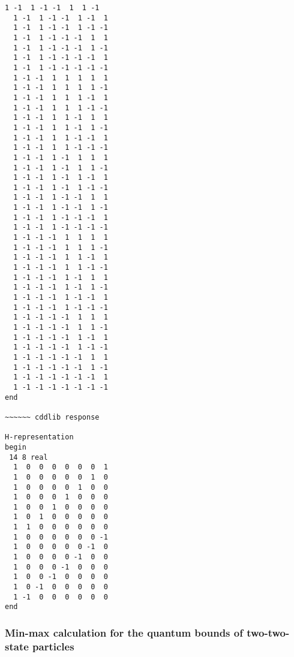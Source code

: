 \documentclass[%
 showpacs,
 showkeys,
 preprintnumbers,
 amsmath,amssymb,
 aps,
  pra,
  longbibliography,
 floatfix,
 ]{revtex4-1}
\begin{document}
{\begin{lstlisting}[backgroundcolor=\color{yellow!10},framerule=0pt,breaklines=true, frame=tb]
  1 -1  1 -1 -1  1  1 -1
  1 -1  1 -1 -1  1 -1  1
  1 -1  1 -1 -1  1 -1 -1
  1 -1  1 -1 -1 -1  1  1
  1 -1  1 -1 -1 -1  1 -1
  1 -1  1 -1 -1 -1 -1  1
  1 -1  1 -1 -1 -1 -1 -1
  1 -1 -1  1  1  1  1  1
  1 -1 -1  1  1  1  1 -1
  1 -1 -1  1  1  1 -1  1
  1 -1 -1  1  1  1 -1 -1
  1 -1 -1  1  1 -1  1  1
  1 -1 -1  1  1 -1  1 -1
  1 -1 -1  1  1 -1 -1  1
  1 -1 -1  1  1 -1 -1 -1
  1 -1 -1  1 -1  1  1  1
  1 -1 -1  1 -1  1  1 -1
  1 -1 -1  1 -1  1 -1  1
  1 -1 -1  1 -1  1 -1 -1
  1 -1 -1  1 -1 -1  1  1
  1 -1 -1  1 -1 -1  1 -1
  1 -1 -1  1 -1 -1 -1  1
  1 -1 -1  1 -1 -1 -1 -1
  1 -1 -1 -1  1  1  1  1
  1 -1 -1 -1  1  1  1 -1
  1 -1 -1 -1  1  1 -1  1
  1 -1 -1 -1  1  1 -1 -1
  1 -1 -1 -1  1 -1  1  1
  1 -1 -1 -1  1 -1  1 -1
  1 -1 -1 -1  1 -1 -1  1
  1 -1 -1 -1  1 -1 -1 -1
  1 -1 -1 -1 -1  1  1  1
  1 -1 -1 -1 -1  1  1 -1
  1 -1 -1 -1 -1  1 -1  1
  1 -1 -1 -1 -1  1 -1 -1
  1 -1 -1 -1 -1 -1  1  1
  1 -1 -1 -1 -1 -1  1 -1
  1 -1 -1 -1 -1 -1 -1  1
  1 -1 -1 -1 -1 -1 -1 -1
end

~~~~~~ cddlib response

H-representation
begin
 14 8 real
  1  0  0  0  0  0  0  1
  1  0  0  0  0  0  1  0
  1  0  0  0  0  1  0  0
  1  0  0  0  1  0  0  0
  1  0  0  1  0  0  0  0
  1  0  1  0  0  0  0  0
  1  1  0  0  0  0  0  0
  1  0  0  0  0  0  0 -1
  1  0  0  0  0  0 -1  0
  1  0  0  0  0 -1  0  0
  1  0  0  0 -1  0  0  0
  1  0  0 -1  0  0  0  0
  1  0 -1  0  0  0  0  0
  1 -1  0  0  0  0  0  0
end

\end{lstlisting}  }



\subsubsection{Min-max calculation for the quantum bounds of two-two-state particles}
\end{document}
